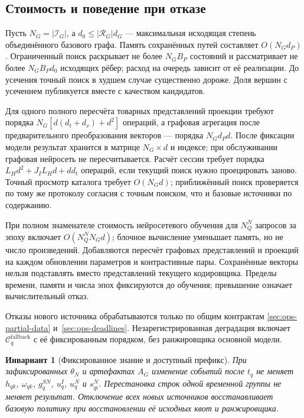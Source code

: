 \documentclass[12pt,a4paper]{article}
\theoremstyle{plainru}
\newtheorem{invariant}{Инвариант}[section]
\begin{document}
\subsection{Стоимость и поведение при отказе}
\label{sec:modern-cost}

Пусть $N_G=|\mathcal I_G|$, а
$d_0\le|\mathcal R_G|d_G$ --- максимальная исходящая степень
объединённого базового графа.
Память сохранённых путей составляет $O(N_Gd_P)$.
Ограниченный поиск раскрывает не более $N_GB_P$ состояний
и рассматривает не более $N_GB_Pd_0$ исходящих рёбер;
расход на очередь зависит от её реализации.
До усечения точный поиск в худшем случае существенно дороже.
Доля вершин с усечением публикуется вместе с качеством кандидатов.

Для одного полного пересчёта товарных представлений
проекции требуют порядка
$N_G[d(d_t+d_v)+d^2]$ операций,
а графовая агрегация после предварительного преобразования
векторов --- порядка $N_Gd_Pd$.
После фиксации модели результат хранится в матрице $N_G\times d$
и индексе; при обслуживании графовая нейросеть не пересчитывается.
Расчёт сессии требует порядка
$L_Hd^2+J_IL_Hd+d d_t$ операций,
если текущий поиск нужно проецировать заново.
Точный просмотр каталога требует $O(N_Gd)$;
приближённый поиск проверяется по тому же протоколу согласия
с точным поиском, что и базовые источники по содержанию.

При полном знаменателе стоимость нейросетевого обучения для
$N_Q^N$ запросов за эпоху включает $O(N_Q^NN_Gd)$;
блочное вычисление уменьшает память, но не число произведений.
Добавляются пересчёт графовых представлений и проекций на каждом
обновлении параметров и контрастивные пары. Сохранённые векторы
нельзя подставлять вместо представлений текущего кодировщика.
Пределы времени, памяти и числа эпох фиксируются до обучения;
превышение означает вычислительный отказ.

Отказы нового источника обрабатываются только по общим контрактам
\ref{sec:ops-partial-data} и~\ref{sec:ops-deadlines}. Незарегистрированная
деградация включает $\mathcal C_q^{\mathrm{fallback}}$ с её фиксированным
порядком, без ранжировщика основной модели.

\begin{invariant}[Фиксированное знание и доступный префикс]
При зафиксированных $\theta_N$ и артефактах $A_G$ изменение событий
после $t_q$ не меняет $h_{qk}$, $\omega_{qk}$, $g_q^{SN}$,
$u_q^I$, $u_q^N$ и $s_{qi}^N$.
Перестановка строк одной временной группы не меняет результат.
Отключение всех новых источников восстанавливает базовую политику
при восстановлении её исходных квот и ранжировщика.
\end{invariant}
\end{document}
